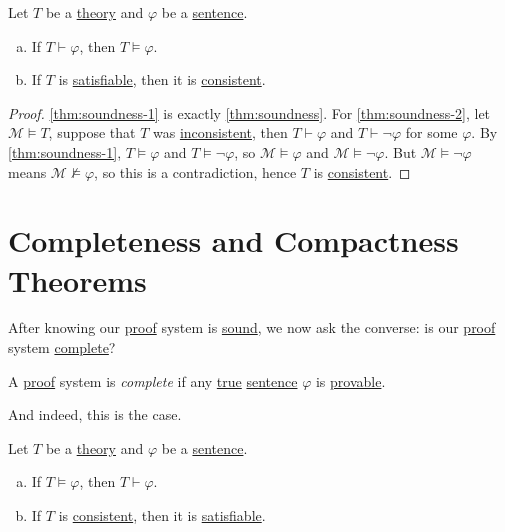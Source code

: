 \begin{theorem}[Soundness]\label{thm:soundness}
	Let \(T\) be a \hyperref[def:theory]{theory} and \(\varphi \) be a \hyperref[def:sentence]{sentence}.
	\begin{enumerate}[(a)]
		\item\label{thm:soundness-1} If \(T \vdash \varphi \), then \(T \models \varphi \).
		\item\label{thm:soundness-2} If \(T\) is \hyperref[def:satisfiable]{satisfiable}, then it is \hyperref[def:consistent]{consistent}.
	\end{enumerate}
\end{theorem}
\begin{proof}
	\autoref{thm:soundness-1} is exactly \autoref{thm:soundness}. For \autoref{thm:soundness-2}, let \(\mathcal{M} \models T\), suppose that \(T\) was \hyperref[def:inconsistent]{inconsistent}, then \(T\vdash \varphi \) and \(T\vdash \lnot \varphi \) for some \(\varphi \). By \autoref{thm:soundness-1}, \(T \models \varphi \) and \(T \models \lnot \varphi \), so \(\mathcal{M} \models \varphi \) and \(\mathcal{M} \models \lnot \varphi \). But \(\mathcal{M} \models \lnot \varphi \) means \(\mathcal{M} \not \models \varphi \), so this is a contradiction, hence \(T\) is \hyperref[def:consistent]{consistent}.
\end{proof}

\section{Completeness and Compactness Theorems}
After knowing our \hyperref[def:proof]{proof} system is \hyperref[def:sound]{sound}, we now ask the converse: is our \hyperref[def:proof]{proof} system \hyperref[def:complete]{complete}?

\begin{definition}[Complete]\label{def:complete}
	A \hyperref[def:proof]{proof} system is \emph{complete} if any \hyperref[def:truth]{true} \hyperref[def:sentence]{sentence} \(\varphi \) is \hyperref[def:proof]{provable}.
\end{definition}

And indeed, this is the case.

\begin{theorem}[Completeness]\label{thm:completeness}
	Let \(T\) be a \hyperref[def:theory]{theory} and \(\varphi \) be a \hyperref[def:sentence]{sentence}.
	\begin{enumerate}[(a)]
		\item\label{thm:completeness-1} If \(T \models \varphi \), then \(T \vdash \varphi \).
		\item\label{thm:completeness-2} If \(T\) is \hyperref[def:consistent]{consistent}, then it is \hyperref[def:satisfiable]{satisfiable}.
	\end{enumerate}
\end{theorem}

